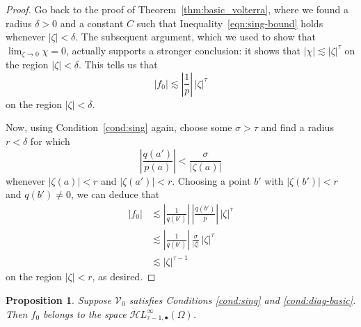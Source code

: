 \documentclass{article}
\theoremstyle{plain}
\newtheorem{prop}{Proposition}
\newcommand{\singexp}[2]{\mathcal{H}L^\infty_{#1, #2}}
\newcommand{\singexpalg}[1]{\singexp{#1}{\bullet}}
\newcommand{\hardpart}{\mathcal{V}_0}
\newcommand{\solproto}{f_0}
\newcommand{\domain}{\Omega}
\begin{document}
\begin{proof}
Go back to the proof of Theorem~\ref{thm:basic_volterra}, where we found a radius $\delta > 0$ and a constant $C$ such that Inequality~\eqref{eqn:sing-bound} holds whenever $|\zeta| < \delta$. The subsequent argument, which we used to show that $\lim_{\zeta \to 0} \chi = 0$, actually supports a stronger conclusion: it shows that $|\chi| \lesssim |\zeta|^\tau$ on the region $|\zeta| < \delta$. This tells us that
\[ |\solproto| \lesssim \left|\frac{1}{p}\right|\,|\zeta|^\tau \]
on the region $|\zeta| < \delta$.

Now, using Condition~\eqref{cond:sing} again, choose some $\sigma > \tau$ and find a radius $r < \delta$ for which
\[ \left|\frac{q(a')}{p(a)}\right| < \frac{\sigma}{|\zeta(a)|} \]
whenever $|\zeta(a)| < r$ and $|\zeta(a')| < r$. Choosing a point $b'$ with $|\zeta(b')| < r$ and $q(b') \neq 0$, we can deduce that
\begin{align*}
|\solproto| & \lesssim \left|\frac{1}{q(b')}\right|\,\left|\frac{q(b')}{p}\right|\,|\zeta|^\tau \\
& \lesssim \left|\frac{1}{q(b')}\right|\,\frac{\sigma}{|\zeta|}\,|\zeta|^\tau \\
& \lesssim |\zeta|^{\tau-1}
\end{align*}
on the region $|\zeta| < r$, as desired.
\end{proof}
\begin{prop}\label{prop:asymptotic at infinity}
Suppose $\hardpart$ satisfies {\em Conditions \eqref{cond:sing}} and \eqref{cond:diag-basic}. Then $\solproto$ belongs to the space $\singexpalg{\tau-1}(\domain)$.
\end{prop}
\end{document}
